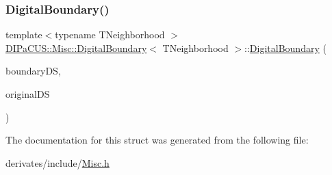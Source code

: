 \subsubsection{\texorpdfstring{Digital\+Boundary()}{DigitalBoundary()}}
{\footnotesize\ttfamily template$<$typename T\+Neighborhood $>$ \\
\mbox{\hyperlink{structDIPaCUS_1_1Misc_1_1DigitalBoundary}{D\+I\+Pa\+C\+U\+S\+::\+Misc\+::\+Digital\+Boundary}}$<$ T\+Neighborhood $>$\+::\mbox{\hyperlink{structDIPaCUS_1_1Misc_1_1DigitalBoundary}{Digital\+Boundary}} (\begin{DoxyParamCaption}\item[{\mbox{\hyperlink{structDIPaCUS_1_1Misc_1_1DigitalBoundary_aedd7527b8021fdf88fcb01474bd77027}{Digital\+Set}} \&}]{boundary\+DS,  }\item[{const \mbox{\hyperlink{structDIPaCUS_1_1Misc_1_1DigitalBoundary_aedd7527b8021fdf88fcb01474bd77027}{Digital\+Set}} \&}]{original\+DS }\end{DoxyParamCaption})\hspace{0.3cm}{\ttfamily [inline]}}



The documentation for this struct was generated from the following file\+:\begin{DoxyCompactItemize}
\item 
derivates/include/\mbox{\hyperlink{Misc_8h}{Misc.\+h}}\end{DoxyCompactItemize}
